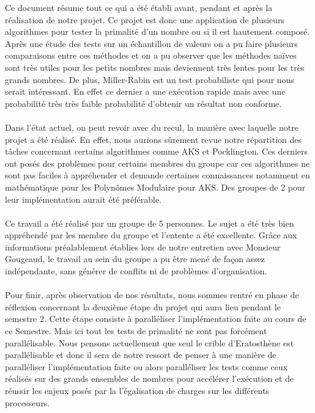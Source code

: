 	Ce document résume tout ce qui a été établi avant, pendant et après la réalisation de notre projet. Ce projet est donc une application de plusieurs algorithmes pour tester la primalité d'un nombre ou si il est hautement composé. Après une étude des tests sur un échantillon de valeurs on a pu faire plusieurs comparaisons entre ces méthodes et on a pu observer que les méthodes naïves sont très utiles pour les petits nombres mais deviennent très lentes pour les très grands nombres. De plus, Miller-Rabin est un test probabiliste qui pour nous serait intéressant. En effet ce dernier a une exécution rapide mais avec une probabilité très très faible probabilité d'obtenir un résultat non conforme.
		\paragraph{} Dans l'état actuel, on peut revoir avec du recul, la manière avec laquelle notre projet a été réalisé. En effet, nous aurions sûrement revue notre répartition des tâches concernant certains algorithmes comme AKS et Pocklington. Ces derniers ont posés des problèmes pour certains membres du groupe car ces algorithmes ne sont pas faciles à appréhender et demande certaines connaissances notamment en mathématique pour les Polynômes Modulaire pour AKS. Des groupes de 2 pour leur implémentation aurait été préférable.
		\paragraph{} Ce travail a été réalisé par un groupe de 5 personnes. Le sujet a été très bien appréhendé par les membre du groupe et l'entente a été excellente. Grâce aux informations préalablement établies lors de notre entretien avec Monsieur Gougeaud, le travail au sein du groupe a pu être mené de façon assez indépendante, sans générer de conflits ni de problèmes d'organisation.		
		\paragraph{} Pour finir, après observation de nos résultats, nous sommes rentré en phase de réflexion concernant la deuxième étape du projet qui aura lieu pendant le semestre 2. Cette étape consiste à paralléliser l'implémentation faite au cours de ce Semestre. Mais ici tout les tests de primalité ne sont pas forcément parallélisable. Nous pensons actuellement que seul le crible d'Eratosthène est parallélisable et donc il sera de notre ressort de penser à une manière de paralléliser l'implémentation faite ou alors paralléliser les tests comme ceux réalisés sur des grands ensembles de nombres pour accélérer l'exécution et de réussir les enjeux posés par la l'égalisation de charges sur les différents processeurs.




